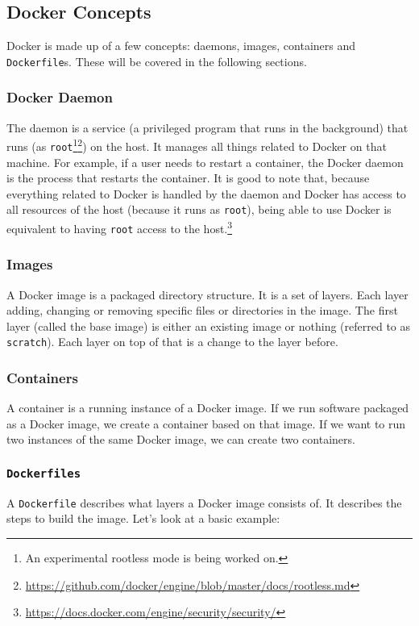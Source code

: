 \subsection{Docker Concepts}
Docker is made up of a few concepts: daemons, images, containers and \lstinline{Dockerfile}s. These will be covered in the following sections.

\subsubsection{Docker Daemon}
The daemon is a service (a privileged program that runs in the background) that runs (as \lstinline{root}\footnote{An experimental rootless mode is being worked on.}\footnote{\url{https://github.com/docker/engine/blob/master/docs/rootless.md}}) on the host. It manages all things related to Docker on that machine. For example, if a user needs to restart a container, the Docker daemon is the process that restarts the container. It is good to note that, because everything related to Docker is handled by the daemon and Docker has access to all resources of the host (because it runs as \lstinline{root}), being able to use Docker is equivalent to having \lstinline{root} access to the host.\footnote{\url{https://docs.docker.com/engine/security/security/}}

\subsubsection{Images}
A Docker image is a packaged directory structure. It is a set of layers. Each layer adding, changing or removing specific files or directories in the image. The first layer (called the base image) is either an existing image or nothing (referred to as \lstinline{scratch}). Each layer on top of that is a change to the layer before.

\subsubsection{Containers}
A container is a running instance of a Docker image. If we run software packaged as a Docker image, we create a container based on that image. If we want to run two instances of the same Docker image, we can create two containers.

\subsubsection{\texorpdfstring{\lstinline{Dockerfiles}}{Dockerfiles}}
A \lstinline{Dockerfile} describes what layers a Docker image consists of. It describes the steps to build the image. Let's look at a basic example:

